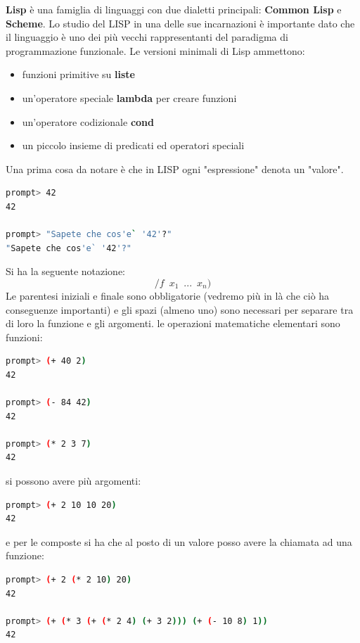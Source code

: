 \documentclass[a4paper,12pt, oneside]{book}
\begin{document}
\textbf{Lisp} è una famiglia di linguaggi con due dialetti principali: \textbf{Common Lisp} e \textbf{Scheme}. Lo studio del LISP in una delle sue incarnazioni è importante dato che il linguaggio è uno dei più vecchi rappresentanti del paradigma di programmazione funzionale. Le versioni minimali di Lisp ammettono:
\begin{itemize}
\item funzioni primitive su \textbf{liste}
\item un'operatore speciale \textbf{lambda} per creare funzioni
\item un'operatore codizionale \textbf{cond}
\item un piccolo insieme di predicati ed operatori speciali
\end{itemize}
Una prima cosa da notare è che in LISP ogni "espressione" denota un
"valore".
\begin{shaded}
\begin{lstlisting}[language=bash]
prompt> 42
42

prompt> "Sapete che cos'e` '42'?"
"Sapete che cos'e` '42'?"
\end{lstlisting}
\end{shaded} Si ha la seguente notazione:
$$/f\,\,\, x_1\,\,\,...\,\,\, x_n)$$
Le parentesi iniziali e finale sono obbligatorie (vedremo più in là
che ciò ha conseguenze importanti) e gli spazi (almeno uno)
sono necessari per separare tra di loro la funzione e gli argomenti.
le operazioni matematiche elementari sono funzioni:
\begin{shaded}
\begin{lstlisting}[language=bash]
prompt> (+ 40 2)
42

prompt> (- 84 42)
42

prompt> (* 2 3 7)
42
\end{lstlisting}
\end{shaded}
si possono avere più argomenti:
\begin{shaded}
\begin{lstlisting}[language=bash]
prompt> (+ 2 10 10 20)
42
\end{lstlisting}
\end{shaded}
e per le composte si ha che al posto di un valore posso avere la chiamata ad una funzione: 
\begin{shaded}
\begin{lstlisting}[language=bash]
prompt> (+ 2 (* 2 10) 20)
42

prompt> (+ (* 3 (+ (* 2 4) (+ 3 2))) (+ (- 10 8) 1))
42
\end{lstlisting}
\end{shaded}
\end{document}
